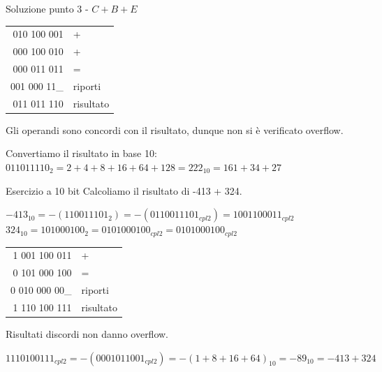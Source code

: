 \documentclass[9pt, handout]{beamer}
\begin{document}
\begin{frame}{Soluzione punto 3 - $C+B+E$}
\begin{tabular}{r|l}
	010 100 001 & + \\
	000 100 010 & + \\
	000 011 011 &	=	\\
	\hline
	001 000 11\_&	riporti\\
	011 011 110	& risultato
\end{tabular}

\pause
Gli operandi sono concordi con il risultato, dunque non si è verificato overflow.

\pause
Convertiamo il risultato in base 10: $011011110_2 = 2+4+8+16+64+128 = 222_{10} = 161+34+27$
\end{frame}

\begin{frame}{Esercizio a 10 bit}
Calcoliamo il risultato di -413 + 324.

\pause
$-413_{10} = -(110011101_2) = -(0110011101_{cpl2}) = 1001100011_{cpl2}$\\
$324_{10} = 101000100_2 = 0101000100_{cpl2}        = 0101000100_{cpl2}$

\pause
\begin{tabular}{r|l}
	1 001 100 011 & + \\
	0 101 000 100 & = \\
	\hline
	0 010 000 00\_&	riporti\\
    1 110 100 111 & risultato
\end{tabular}

\pause
Risultati discordi non danno overflow.

\pause
$1110100111_{cpl2} = -(0001011001_{cpl2}) = -(1+8+16+64)_{10} = -89_{10} = -413+324$
\end{frame}
\end{document}
